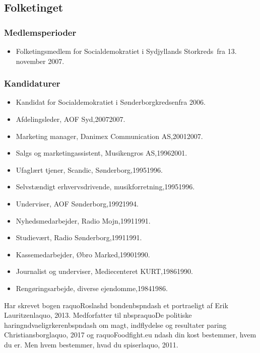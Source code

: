 \documentclass[11pt, a4paper]{awesome-cv}
\begin{document}
\begin{cvletter}
\subsection*{Folketinget}
\subsubsection*{Medlemsperioder}
\begin{itemize}
\item Folketingsmedlem for Socialdemokratiet i Sydjyllands Storkreds fra 13. november 2007.
\end{itemize}
\subsubsection*{Kandidaturer}
\begin{itemize}
\item Kandidat for Socialdemokratiet i Sønderborgkredsenfra 2006.
\end{itemize}
\begin{itemize}
\item Afdelingsleder, AOF Syd,20072007.
\item Marketing manager, Danimex Communication AS,20012007.
\item Salgs og marketingassistent, Musikengros AS,19962001.
\item Ufaglært tjener, Scandic, Sønderborg,19951996.
\item Selvstændigt erhvervsdrivende, musikforretning,19951996.
\item Underviser, AOF Sønderborg,19921994.
\item Nyhedsmedarbejder, Radio Mojn,19911991.
\item Studievært, Radio Sønderborg,19911991.
\item Kassemedarbejder, Øbro Marked,19901990.
\item Journalist og underviser, Mediecenteret KURT,19861990.
\item Rengøringsarbejde, diverse ejendomme,19841986.
\end{itemize}
Har skrevet bogen raquoRoslashd bondenbspndash et portraeligt af Erik Lauritzenlaquo, 2013. Medforfatter til nbspraquoDe politiske haringndvaeligrkerenbspndash om magt, indflydelse og resultater paring Christiansborglaquo, 2017 og raquoFoodfight.eu ndash din kost bestemmer, hvem du er. Men hvem bestemmer, hvad du spiserlaquo, 2011.

\end{cvletter}
\end{document}
